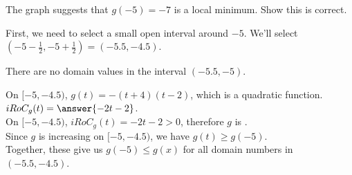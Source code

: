 \documentclass{ximera}
\begin{document}
\begin{exercise}
The graph suggests that $g(-5) = -7$ is a local minimum.  Show this is correct. \\





\begin{explanation}



First, we need to select a small open interval around $-5$.  We'll select $\left( -5 - \frac{1}{2}, -5 + \frac{1}{2} \right) = (-5.5, -4.5)$.

There are no domain values in the interval $(-5.5, -5)$.

On $[-5, -4.5)$,  $g(t) = -(t+4)(t-2)$, which is a quadratic function.  $iRoC_g(t) = \answer{-2t - 2}$. \\

On $[-5, -4.5)$, $iRoC_g(t) = -2t - 2 > 0$, therefore $g$ is  . \\

Since $g$ is increasing on $[-5, -4.5)$, we have $g(t) \geq g(-5)$. \\






Together, these give us $g(-5) \leq g(x)$ for all domain numbers in $(-5.5, -4.5)$.

\end{explanation}










\end{exercise}
\end{document}
